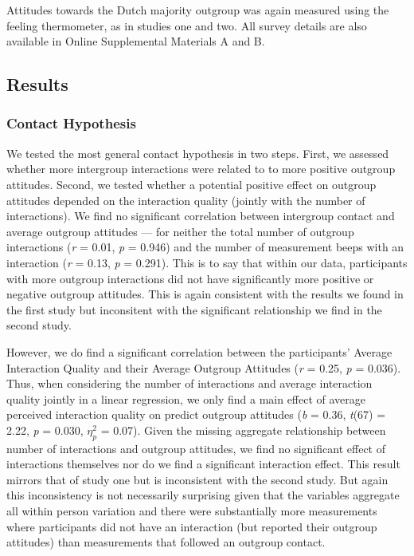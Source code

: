 Attitudes towards the Dutch majority outgroup was again measured using
the feeling thermometer, as in studies one and two. All survey details
are also available in Online Supplemental Materials A and B.




\subsection{Results}

\subsubsection{Contact Hypothesis}

We tested the most general contact hypothesis in two steps. First, we
assessed whether more intergroup interactions were related to to more
positive outgroup attitudes. Second, we tested whether a potential
positive effect on outgroup attitudes depended on the interaction
quality (jointly with the number of interactions). We find no
significant correlation between intergroup contact and average outgroup
attitudes --- for neither the total number of outgroup interactions
(\textit{r} = 0.01, \textit{p} = 0.946) and the number of measurement
beeps with an interaction (\textit{r} = 0.13, \textit{p} = 0.291). This
is to say that within our data, participants with more outgroup
interactions did not have significantly more positive or negative
outgroup attitudes. This is again consistent with the results we found
in the first study but inconsitent with the significant relationship we
find in the second study.

However, we do find a significant correlation between the participants'
Average Interaction Quality and their Average Outgroup Attitudes
(\textit{r} = 0.25, \textit{p} = 0.036). Thus, when considering the
number of interactions and average interaction quality jointly in a
linear regression, we only find a main effect of average perceived
interaction quality on predict outgroup attitudes (\textit{b} = 0.36,
\textit{t}(67) = 2.22, \textit{p} = 0.030, \(\eta_p^2\) = 0.07). Given
the missing aggregate relationship between number of interactions and
outgroup attitudes, we find no significant effect of interactions
themselves nor do we find a significant interaction effect. This result
mirrors that of study one but is inconsistent with the second study. But
again this inconsistency is not necessarily surprising given that the
variables aggregate all within person variation and there were
substantially more measurements where participants did not have an
interaction (but reported their outgroup attitudes) than measurements
that followed an outgroup contact.

